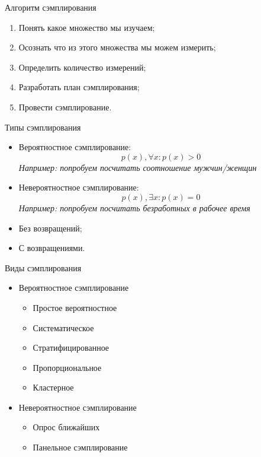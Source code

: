 \documentclass[14pt, fleqn, xcolor={dvipsnames, table}]{beamer}
\begin{document}
\begin{frame}{Алгоритм сэмплирования}
\begin{enumerate}
   \item Понять какое множество мы изучаем;
   \item Осознать что из этого множества мы можем измерить;
   \item Определить количество измерений;
   \item Разработать план сэмплирования;
   \item Провести сэмплирование.
\end{enumerate}
\end{frame}

\begin{frame}{Типы сэмплирования}
\begin{itemize}
   \item Вероятностное сэмплирование: 
   $$
   p(x),\forall x:p(x) > 0
   $$
   \textit{Например: попробуем посчитать соотношение мужчин/женщин}
   \item Невероятностное сэмплирование:
   $$
   p(x), \exists x: p(x) = 0
   $$
   \textit{Например: попробуем посчитать безработных в рабочее время}
   \item Без возвращений;
   \item С возвращениями.
\end{itemize}
\end{frame}

\begin{frame}{Виды сэмплирования}
\begin{itemize}
   \item Вероятностное сэмплирование
   \begin{itemize}
    \item Простое вероятностное
    \item Систематическое
    \item Стратифицированное
    \item Пропорциональное
    \item Кластерное
   \end{itemize}
   \item Невероятностное сэмплирование
   \begin{itemize}
    \item Опрос ближайших
    \item Панельное сэмплирование
   \end{itemize}
\end{itemize}
\end{frame}
\end{document}
